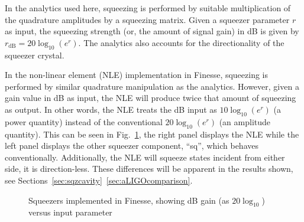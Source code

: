 \documentclass[aps,pra,superscriptaddress,reprint,nofootinbib]{revtex4-1}
\begin{document}
In the analytics used here, squeezing is performed by suitable multiplication of the quadrature amplitudes by a squeezing matrix. Given a squeezer parameter $r$ as input, the squeezing strength (or, the amount of signal gain) in dB is given by $r_{\mathrm{dB}} = 20 \log_{10}(e^r)$. The analytics also accounts for the directionality of the squeezer crystal.


In the non-linear element (NLE) implementation in Finesse, squeezing is performed by similar quadrature manipulation as the analytics. However, given a gain value in dB as input, the NLE will produce twice that amount of squeezing as output. In other words, the NLE treats the dB input as $10 \log_{10} (e^r)$ (a power quantity) instead of the conventional $20 \log_{10} (e^r)$ (an amplitude quantity). This can be seen in Fig.~\ref{fig:testing_Finesse_squeezers}, the right panel displays the NLE while the left panel displays the other squeezer component, “sq”, which behaves conventionally. Additionally, the NLE will squeeze states incident from either side, it is direction-less. These differences will be apparent in the results shown, see Sections~\ref{sec:sqzcavity}~\ref{sec:aLIGOcomparison}.

\begin{figure}%
    \centering
    \qquad
    \caption{Squeezers implemented in Finesse, showing dB gain (as $20 \log_{10}$) versus input parameter}%
    \label{fig:testing_Finesse_squeezers}%
\end{figure}
\end{document}
